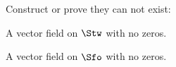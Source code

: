 Construct or prove they can not exist:
\begin{alist}
\item A vector field on $\Stw$ with no zeros.
\item A vector field on $\Sfo$ with no zeros.
\end{alist}
